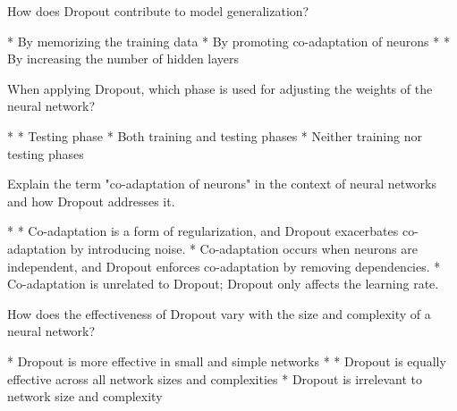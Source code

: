 \documentclass[10pt]{extarticle}
\begin{document}
\begin{exercise}
    How does Dropout contribute to model generalization?
    \begin{choice}
        * By memorizing the training data
        * By promoting co-adaptation of neurons
        * 
        * By increasing the number of hidden layers
    \end{choice}
\end{exercise}
\begin{solution}
\end{solution}

\begin{exercise}
    When applying Dropout, which phase is used for adjusting the weights of the neural network?
    \begin{choice}
        * 
        * Testing phase
        * Both training and testing phases
        * Neither training nor testing phases
    \end{choice}
\end{exercise}
\begin{solution}
\end{solution}

\begin{exercise}
    Explain the term "co-adaptation of neurons" in the context of neural networks and how Dropout addresses it.
    \begin{choice}
        * 
        * Co-adaptation is a form of regularization, and Dropout exacerbates co-adaptation by introducing noise.
        * Co-adaptation occurs when neurons are independent, and Dropout enforces co-adaptation by removing dependencies.
        * Co-adaptation is unrelated to Dropout; Dropout only affects the learning rate.
    \end{choice}
\end{exercise}
\begin{solution}
\end{solution}

\begin{exercise}
    How does the effectiveness of Dropout vary with the size and complexity of a neural network?
    \begin{choice}
        * Dropout is more effective in small and simple networks
        * 
        * Dropout is equally effective across all network sizes and complexities
        * Dropout is irrelevant to network size and complexity
    \end{choice}
\end{exercise}
\begin{solution}
\end{solution}
\end{document}
